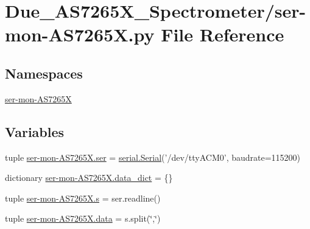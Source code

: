 \hypertarget{ser-mon-AS7265X_8py}{\section{Due\-\_\-\-A\-S7265\-X\-\_\-\-Spectrometer/ser-\/mon-\/\-A\-S7265\-X.py File Reference}
\label{ser-mon-AS7265X_8py}
}
\subsection*{Namespaces}
\begin{DoxyCompactItemize}
\item 
\hyperlink{namespaceser-mon-AS7265X}{ser-\/mon-\/\-A\-S7265\-X}
\end{DoxyCompactItemize}
\subsection*{Variables}
\begin{DoxyCompactItemize}
\item 
tuple \hyperlink{namespaceser-mon-AS7265X_a14d3bc0154dd41ac4329c332a73a9f85}{ser-\/mon-\/\-A\-S7265\-X.\-ser} = \hyperlink{HardwareSerial_8h_a7b8c4a195c58f9eb8750e94955c5aa4b}{serial.\-Serial}('/dev/tty\-A\-C\-M0', baudrate=115200)
\item 
dictionary \hyperlink{namespaceser-mon-AS7265X_a2ca2a7586fd8176729e53f614af30eff}{ser-\/mon-\/\-A\-S7265\-X.\-data\-\_\-dict} = \{\}
\item 
tuple \hyperlink{namespaceser-mon-AS7265X_a9378f765d3cec20083312b237c585e4a}{ser-\/mon-\/\-A\-S7265\-X.\-s} = ser.\-readline()
\item 
tuple \hyperlink{namespaceser-mon-AS7265X_aee1f9cc5d7cb69238c16b1063ac2ca72}{ser-\/mon-\/\-A\-S7265\-X.\-data} = s.\-split(\char`\"{},\char`\"{})
\end{DoxyCompactItemize}
